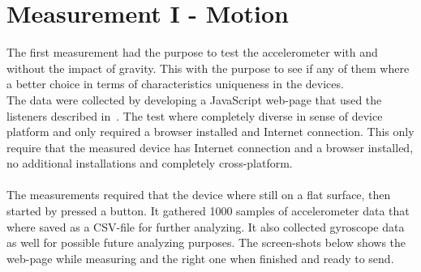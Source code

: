 \section{Measurement I - Motion}\label{sec:measurementI}
The first measurement had the purpose to test the accelerometer with and without the impact of gravity. This with the purpose to see if any of them where a better choice in terms of characteristics uniqueness in the devices.\\
The data were collected by developing a JavaScript web-page that used the listeners described in~. The test where completely diverse in sense of device platform and only required a browser installed and Internet connection. 
This only require that the measured device has Internet connection and a browser installed, no additional installations and completely cross-platform.\\
\\
The measurements required that the device where still on a flat surface, then started by pressed a button. It gathered 1000 samples of accelerometer data that where saved as a CSV-file for further analyzing. It also collected gyroscope data as well for possible future analyzing purposes. The screen-shots below shows the web-page while measuring and the right one when finished and ready to send. 
